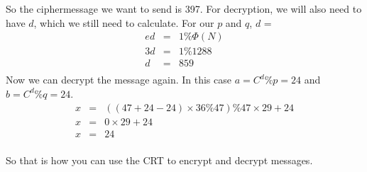 So the ciphermessage we want to send is 397. For decryption, we will also need to have $d$, which we still need to calculate. For our $p$ and $q$, $d$ = 
\begin{eqnarray}
ed &=& 1 \% \Phi(N) \\
3d &=& 1 \% 1288 \\
d &=& 859 \\
\end{eqnarray}
Now we can decrypt the message again. In this case $a = C^d \% p = 24$ and $b = C^d \% q = 24$.
\begin{eqnarray}
x &=& ((47 + 24 - 24) \times 36 \% 47) \% 47 \times 29 + 24 \\
x &=& 0 \times 29 + 24 \\
x &=& 24\\
\end{eqnarray}

So that is how you can use the CRT to encrypt and decrypt messages. 









